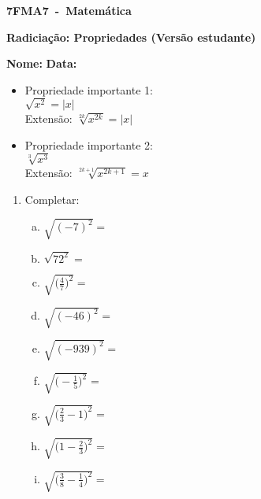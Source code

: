 \documentclass[a4paper,14pt]{article}
\begin{document}
	
	\noindent\textbf{7FMA7~-~Matemática} 
	
	\begin{center}
		\textbf{Radiciação: Propriedades (Versão estudante)}
	\end{center}
	
	
	\noindent\textbf{Nome:} \underline{\hspace{10cm}}
    \noindent\textbf{Data:} \underline{\hspace{4cm}}
	
	
	\begin{multicols}{2}
    \begin{itemize}
    	\item Propriedade importante 1: \\
    	$\sqrt{x^2} = |x|$ \\
    	Extensão: $ \sqrt[2k]{x^{2k}} = |x|$ \\
    	\item Propriedade importante 2: \\
    	$\sqrt[3]{x^3}$ \\
    	Extensão: $\sqrt[{2k + 1}]{x^{2k + 1}} = x$
    \end{itemize}
	\begin{enumerate}
		
		\item Completar:
		\begin{enumerate}[a)]
			\item $\sqrt{(-7)^2} = $
			\item $\sqrt{72^2} = $
			\item $\sqrt{\bigg(\frac{4}{7}\bigg)^2} = $
			\item $\sqrt{(-46)^2} = $
			\item $\sqrt{(-939)^2} = $
			\item $\sqrt{\bigg(-\frac{1}{5}\bigg)^2} = $
			\item $\sqrt{\bigg(\frac{2}{3}-1\bigg)^2} = $
			\item $\sqrt{\bigg(1-\frac{2}{3}\bigg)^2} = $
			\item $\sqrt{\bigg(\frac{3}{8} - \frac{1}{4}\bigg)^2} = $
			
	    \end{enumerate}
    

\end{enumerate}
\end{multicols}
\end{document}
